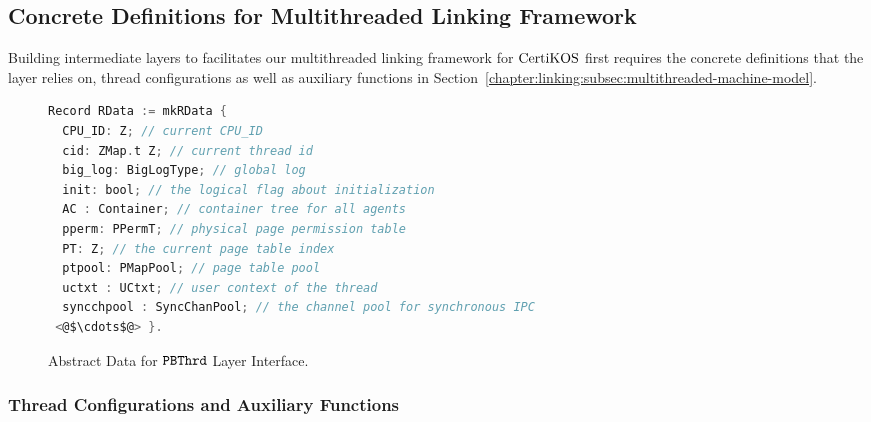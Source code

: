 \subsection{Concrete Definitions for Multithreaded Linking Framework} 
\label{chapter:certikos:phbthread}

Building intermediate layers to facilitates our multithreaded linking framework 
for $\mathrm{CertiKOS}$ first requires the concrete definitions 
that the layer relies on, 
thread configurations as well as auxiliary functions in Section~\ref{chapter:linking:subsec:multithreaded-machine-model}.

\begin{figure}
\begin{lstlisting}[language=C]
Record RData := mkRData {
  CPU_ID: Z; // current CPU_ID 
  cid: ZMap.t Z; // current thread id
  big_log: BigLogType; // global log
  init: bool; // the logical flag about initialization
  AC : Container; // container tree for all agents
  pperm: PPermT; // physical page permission table 
  PT: Z; // the current page table index
  ptpool: PMapPool; // page table pool
  uctxt : UCtxt; // user context of the thread
  syncchpool : SyncChanPool; // the channel pool for synchronous IPC
 <@$\cdots$@> }.
\end{lstlisting}
\caption{Abstract Data for  ${{\mathrm{\texttt{PBThrd}}}}$ Layer Interface.}
\label{fig:chapter:certikos:abstract-data-for-pbthread-layer}
\end{figure}



\subsubsection{Thread Configurations and Auxiliary Functions}

